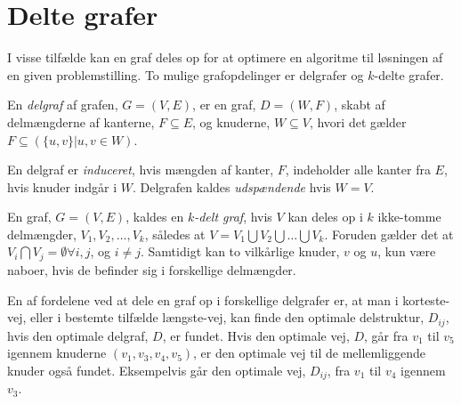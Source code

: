 \section{Delte grafer}
I visse tilfælde kan en graf deles op for at optimere en algoritme til løsningen af en given problemstilling.
To mulige grafopdelinger er delgrafer og $k$-delte grafer.

\begin{defn}[Delgraf] \label{defn:delgraf} %
En \emph{delgraf} af grafen, $G= (V,E)$, er en graf, $D = (W,F)$, skabt af delmængderne af kanterne, $F \subseteq E$, og knuderne, $W \subseteq V$, hvori det gælder $F \subseteq (\{u,v\} | u,v \in W)$.
\end{defn}

En delgraf er \emph{induceret}, hvis mængden af kanter, $F$, indeholder alle kanter fra $E$, hvis knuder indgår i $W$.
Delgrafen kaldes \emph{udspændende} hvis $W=V$. 

\begin{defn} \label{defn:k-delt} %
En graf, $G = (V, E)$, kaldes en \emph{$k$-delt graf}, hvis $V$ kan deles op i $k$ ikke-tomme delmængder, $V_1, V_2,\dotsc, V_k$, således at $V= V_1 \bigcup V_2 \bigcup \dotsc \bigcup V_k$. Foruden gælder det at $V_i \bigcap V_j  = \emptyset \forall i,j$, og $i\neq j$. Samtidigt kan to vilkårlige knuder, $v$ og $u$, kun være naboer, hvis de befinder sig i forskellige delmængder. 
\end{defn}

En af fordelene ved at dele en graf op i forskellige delgrafer er, at man i korteste-vej, eller i bestemte tilfælde længste-vej, kan finde den optimale delstruktur, $D_{ij}$, hvis den optimale delgraf, $D$, er fundet. Hvis den optimale vej, $D$, går fra $v_1$ til $v_5$ igennem knuderne $(v_1, v_3, v_4, v_5)$, er den optimale vej til de mellemliggende knuder også fundet. Eksempelvis går den optimale vej, $D_{ij}$, fra $v_1$ til $v_4$ igennem $v_3$.


